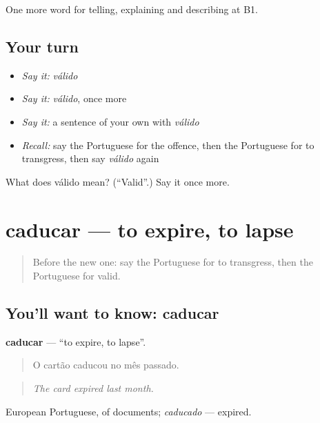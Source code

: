 \begin{grammarlens}[title={What you've built}]
One more word for telling, explaining and describing at B1.
\end{grammarlens}

\subsection*{Your turn}
\begin{itemize}
\raggedright
  \item \emph{Say it:} \emph{válido}
  \item \emph{Say it:} \emph{válido}, once more
  \item \emph{Say it:} a sentence of your own with \emph{válido}
  \item \emph{Recall:} say the Portuguese for the offence, then the Portuguese for to transgress, then say \emph{válido} again
\end{itemize}

\begin{tcolorbox}[breakable,colback=teal!4,colframe=teal!35!black,title={Before you move on}]
What does válido mean? (\textquotedblleft{}Valid\textquotedblright{}.) Say it once more.
\end{tcolorbox}
\section[caducar]{caducar — to expire, to lapse}

\label{lesson:PT-C384-caducar}



\begin{quote}
Before the new one: say the Portuguese for to transgress, then the Portuguese for valid.
\end{quote}

\subsection*{You'll want to know: caducar}
\textbf{caducar} — \textquotedblleft{}to expire, to lapse\textquotedblright{}.

\begin{quote}
O cartão caducou no mês passado.
\end{quote}

\begin{quote}
\emph{The card expired last month.}
\end{quote}

European Portuguese, of documents; \emph{caducado} — expired.

